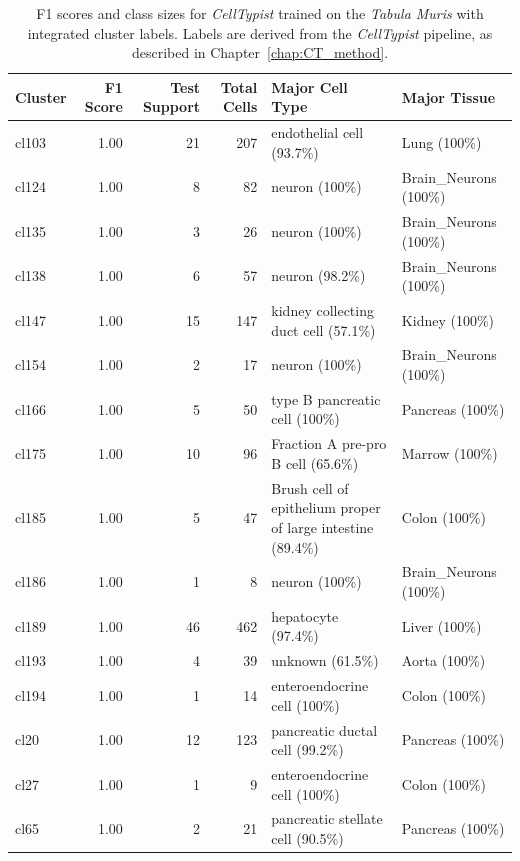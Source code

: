 \begin{table}[ht!]
\scriptsize
\caption[F1 scores and class sizes for \textit{CellTypist} trained on the \textit{Tabula Muris} with integrated cluster labels]{F1 scores and class sizes for \textit{CellTypist} trained on the \textit{Tabula Muris} with integrated cluster labels. Labels are derived from the \textit{CellTypist} pipeline, as described in Chapter~\ref{chap:CT_method}.}
\centering
\label{table:tab_tmmodelclust}
\begin{tabular}{lrrrll}
  \toprule
Cluster & F1 Score & Test Support & Total Cells & Major Cell Type & Major Tissue \\
  \midrule
cl103 & 1.00 &  21 & 207 & endothelial cell (93.7\%) & Lung (100\%) \\ 
  cl124 & 1.00 &   8 &  82 & neuron (100\%) & Brain\_Neurons (100\%) \\ 
  cl135 & 1.00 &   3 &  26 & neuron (100\%) & Brain\_Neurons (100\%) \\ 
  cl138 & 1.00 &   6 &  57 & neuron (98.2\%) & Brain\_Neurons (100\%) \\ 
  cl147 & 1.00 &  15 & 147 & kidney collecting duct cell (57.1\%) & Kidney (100\%) \\ 
  cl154 & 1.00 &   2 &  17 & neuron (100\%) & Brain\_Neurons (100\%) \\ 
  cl166 & 1.00 &   5 &  50 & type B pancreatic cell (100\%) & Pancreas (100\%) \\ 
  cl175 & 1.00 &  10 &  96 & Fraction A pre-pro B cell (65.6\%) & Marrow (100\%) \\ 
  cl185 & 1.00 &   5 &  47 & \specialcell[t]{Brush cell of epithelium proper\\of large intestine (89.4\%) } & Colon (100\%) \\ 
  cl186 & 1.00 &   1 &   8 & neuron (100\%) & Brain\_Neurons (100\%) \\ 
  cl189 & 1.00 &  46 & 462 & hepatocyte (97.4\%) & Liver (100\%) \\ 
  cl193 & 1.00 &   4 &  39 & unknown (61.5\%) & Aorta (100\%) \\ 
  cl194 & 1.00 &   1 &  14 & enteroendocrine cell (100\%) & Colon (100\%) \\ 
  cl20 & 1.00 &  12 & 123 & pancreatic ductal cell (99.2\%) & Pancreas (100\%) \\ 
  cl27 & 1.00 &   1 &   9 & enteroendocrine cell (100\%) & Colon (100\%) \\ 
  cl65 & 1.00 &   2 &  21 & pancreatic stellate cell (90.5\%) & Pancreas (100\%) \\ 

\end{tabular}
\end{table}
